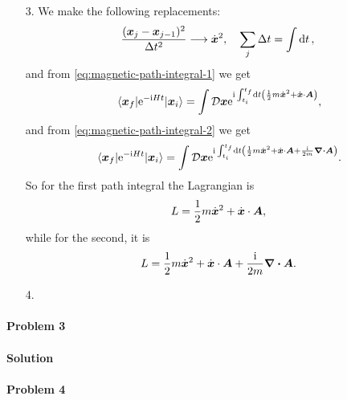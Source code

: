 \documentclass[hyperref, a4paper]{article}
\newcommand*{\ii}{\mathrm{i}}
\newcommand*{\ee}{\mathrm{e}}
\newcommand*{\fd}[1]{\mathcal{D} #1}
\begin{document}
\begin{itemize}
\item[3.] We make the following replacements:
\[
    \frac{(\vb*{x}_j - \vb*{x}_{j-1})^2}{\Delta t^2} \longrightarrow \dot{\vb*{x}}^2, \quad 
    \sum_j \Delta t = \int \dd{t},
\]
and from \eqref{eq:magnetic-path-integral-1} we get 
\begin{equation}
    \mel{\vb*{x}_f}{\ee^{- \ii H t}}{\vb*{x}_i} = \int \fd{\vb*{x}} \ee^{\ii \int_{t_i}^{t_f} \dd{t}
    \left(  \frac{1}{2} m \dot{\vb*{x}}^2 + \dot{\vb*{x}} \cdot \vb*{A}\right) },
\end{equation} 
and from \eqref{eq:magnetic-path-integral-2} we get 
\begin{equation}
    \mel{\vb*{x}_f}{\ee^{- \ii H t}}{\vb*{x}_i} = \int \fd{\vb*{x}} \ee^{\ii \int_{t_i}^{t_f} \dd{t}
    \left(  \frac{1}{2} m \dot{\vb*{x}}^2 + \dot{\vb*{x}} \cdot \vb*{A} + \frac{\ii}{2m} \div{\vb*{A}} \right) }.
\end{equation}
So for the first path integral the Lagrangian is 
\begin{equation}
    L = \frac{1}{2} m \dot{\vb*{x}}^2 + \dot{\vb*{x}} \cdot \vb*{A},
\end{equation}
while for the second, it is 
\begin{equation}
    L = \frac{1}{2} m \dot{\vb*{x}}^2 + \dot{\vb*{x}} \cdot \vb*{A} + \frac{\ii}{2m} \div{\vb*{A}}.
\end{equation}

\item[4.] 

\end{itemize}

\paragraph{Problem 3}

\paragraph{Solution} 

\paragraph{Problem 4} 
\end{document}
